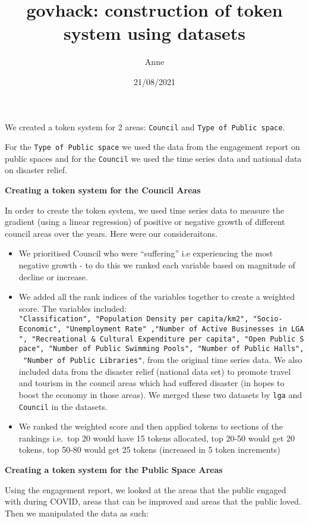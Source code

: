 \documentclass[
]{article}
\title{govhack: construction of token system using datasets}
\author{Anne}
\date{21/08/2021}
\begin{document}
\maketitle

We created a token system for 2 areas: \texttt{Council} and
\texttt{Type\ of\ Public\ space}.

For the \texttt{Type\ of\ Public\ space} we used the data from the
engagement report on public spaces and for the \texttt{Council} we used
the time series data and national data on disaster relief.

\textbf{Creating a token system for the \textbf{Council} Areas}

In order to create the token system, we used time series data to measure
the gradient (using a linear regression) of positive or negative growth
of different council areas over the years. Here were our consideraitons.

\begin{itemize}
\item
  We prioritised Council who were ``suffering'' i.e experiencing the
  most negative growth - to do this we ranked each variable based on
  magnitude of decline or increase.
\item
  We added all the rank indices of the variables together to create a
  weighted score. The variables included:
  \texttt{"Classification",\ "Population\ Density\ per\ capita/km2",\ "Socio-Economic",\ "Unemployment\ Rate"\ ,"Number\ of\ Active\ Businesses\ in\ LGA",\ "Recreational\ \&\ Cultural\ Expenditure\ per\ capita",\ "Open\ Public\ Space",\ "Number\ of\ Public\ Swimming\ Pools",\ "Number\ of\ Public\ Halls",\ "Number\ of\ Public\ Libraries"},
  from the original time series data. We also included data from the
  disaster relief (national data set) to promote travel and tourism in
  the council areas which had suffered disaster (in hopes to boost the
  economy in those areas). We merged these two datasets by \texttt{lga}
  and \texttt{Council} in the datasets.
\item
  We ranked the weighted score and then applied tokens to sections of
  the rankings i.e.~top 20 would have 15 tokens allocated, top 20-50
  would get 20 tokens, top 50-80 would get 25 tokens (increased in 5
  token increments)
\end{itemize}

\textbf{Creating a token system for the \textbf{Public Space} Areas}

Using the engagement report, we looked at the areas that the public
engaged with during COVID, areas that can be improved and areas that the
public loved. Then we manipulated the data as such:
\end{document}
